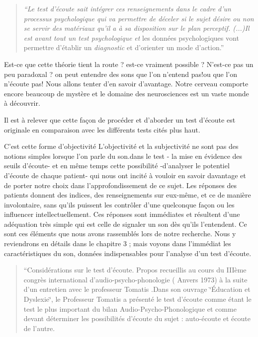 \documentclass[12pt,french]{report}
\makeatletter
\let\SF@@footnote\footnote
\def\footnote{\ifx\protect\@typeset@protect
    \expandafter\SF@@footnote
  \else
    \expandafter\SF@gobble@opt
  \fi
}
\edef\SF@gobble@opt{\noexpand\protect
  \expandafter\noexpand\csname SF@gobble@opt \endcsname}
\makeatother
\begin{document}
\begin{quote}
\emph{``Le test d'écoute sait intégrer ces renseignements dans le
cadre d'un processus psychologique qui va permettre de déceler si
le sujet désire ou non se servir des matériaux qu'il a à sa disposition
sur le plan perceptif. (...)Il est avant tout un test psychologique
et} les données psychologiques vont permettre d'établir un\emph{ diagnostic}
et d'orienter un mode d'action.''
\end{quote}
Est-ce que cette théorie tient la route ? est-ce vraiment possible
? N'est-ce pas un peu paradoxal ? on peut entendre des sons que l'on
n'entend pas!ou que l'on n'écoute pas! Nous allons tenter d'en savoir
d'avantage. Notre cerveau comporte encore beaucoup de mystère et le
domaine des neurosciences est un vaste monde à découvrir. 

Il est à relever que cette façon de procéder et d'aborder un test
d'écoute est originale en comparaison avec les différents tests cités
plus haut.

C'est cette forme d'objectivité \footnote{L'objectivité et la subjectivité ne sont pas des notions simples lorsque
l'on parle du son.}dans le test - la mise en évidence des seuils d'écoute- et en même
temps cette possibilité -d'analyser le potentiel d'écoute de chaque
patient- qui nous ont incité à vouloir en savoir davantage et de porter
notre choix dans l'approfondissement de ce sujet. Les réponses des
patients donnent des indices, des renseignements sur eux-même, et
ce de manière involontaire, sans qu'ils puissent les contrôler d'une
quelconque façon ou les influencer intellectuellement. Ces réponses
sont immédiates et résultent d'une adéquation très simple qui est
celle de signaler un son dès qu'ils l'entendent. Ce sont ces éléments
que nous avons rassemblés lors de notre recherche. Nous y reviendrons
en détails dans le chapitre 3 ; mais voyons dans l'immédiat les caractéristiques
du son, données indispensables pour l'analyse d'un test d'écoute.
\begin{quote}
\footnote{``Considérations sur le test d'écoute. Propos recueillis au cours
du IIIème congrès international d'audio-psycho-phonologie ( Anvers
1973) à la suite d'un entretien avec le professeur Tomatis .Dans son
ouvrage \char`\"{}Éducation et Dyslexie\char`\"{}, le Professeur Tomatis
a présenté le test d'écoute comme étant le test le plus important
du bilan Audio-Psycho-Phonologique et comme devant déterminer les
possibilités d\textquoteright écoute du sujet : auto-écoute et écoute
de l'autre.}
\end{quote}
\end{document}
